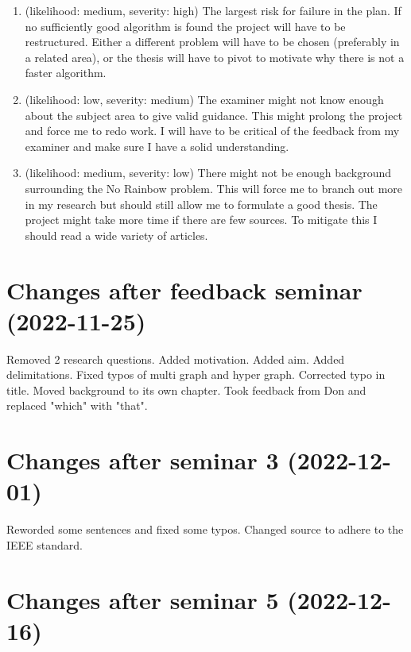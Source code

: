 \documentclass[msc,lith,english]{liuthesis}
\begin{document}
\begin{enumerate}
  \item (likelihood: medium, severity: high)
    The largest risk for failure in the plan. If no sufficiently good algorithm
    is found the project will have to be restructured. Either a different problem
    will have to be chosen (preferably in a related area), or the thesis will have
    to pivot to motivate why there is not a faster algorithm.

  \item (likelihood: low, severity: medium)
    The examiner might not know enough about the subject area to give valid
    guidance. This might prolong the project and force me to redo work. I will
    have to be critical of the feedback from my examiner and make sure I have a
    solid understanding.

  \item (likelihood: medium, severity: low)
    There might not be enough background surrounding the No Rainbow problem.
    This will force me to branch out more in my research but should still allow
    me to formulate a good thesis. The project might take more time if there
    are few sources. To mitigate this I should read a wide variety of articles.
\end{enumerate}

\printbibliography

\appendix
\chapter{Changes after feedback seminar (2022-11-25)}
Removed 2 research questions. Added motivation. Added aim. Added delimitations. Fixed typos of multi graph and hyper graph. Corrected typo in title. Moved background to its own chapter. Took feedback from Don and replaced "which" with "that".

\chapter{Changes after seminar 3 (2022-12-01)}
Reworded some sentences and fixed some typos. Changed source to adhere to the IEEE standard.

\chapter{Changes after seminar 5 (2022-12-16)}
\end{document}
